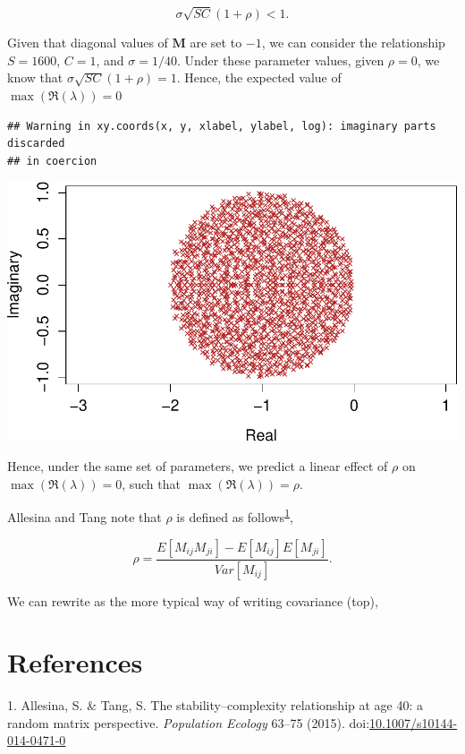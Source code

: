 \documentclass[]{article}
\begin{document}
\[\sigma\sqrt{SC}\left(1 + \rho\right) < 1.\]

Given that diagonal values of \(\textbf{M}\) are set to \(-1\), we can
consider the relationship \(S = 1600\), \(C = 1\), and
\(\sigma = 1/40\). Under these parameter values, given \(\rho = 0\), we
know that \(\sigma\sqrt{SC}\left(1 + \rho\right) = 1\). Hence, the
expected value of \(\max(\Re(\lambda)) = 0\)

\begin{verbatim}
## Warning in xy.coords(x, y, xlabel, ylabel, log): imaginary parts discarded
## in coercion
\end{verbatim}

\includegraphics{revision_notes_files/figure-latex/unnamed-chunk-11-1.pdf}

Hence, under the same set of parameters, we predict a linear effect of
\(\rho\) on \(\max(\Re(\lambda)) = 0\), such that
\(\max(\Re(\lambda)) = \rho\).

Allesina and Tang note that \(\rho\) is defined as
follows\textsuperscript{\protect\hyperlink{ref-Allesina2015a}{1}},

\[\rho = \frac{E[M_{ij}M_{ji}] - E[M_{ij}]E[M_{ji}]}{Var[M_{ij}]}.\]

We can rewrite as the more typical way of writing covariance (top),

\section*{References}\label{references}

\hypertarget{refs}{}
\hypertarget{ref-Allesina2015a}{}
1. Allesina, S. \& Tang, S. The stability--complexity relationship at
age 40: a random matrix perspective. \emph{Population Ecology} 63--75
(2015).
doi:\href{https://doi.org/10.1007/s10144-014-0471-0}{10.1007/s10144-014-0471-0}
\end{document}
